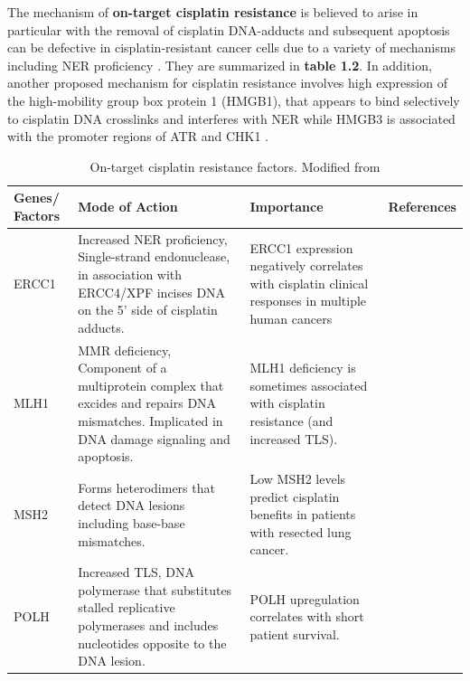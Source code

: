 The mechanism of \textbf{on-target cisplatin resistance} is believed to arise in particular with the removal of cisplatin DNA-adducts and subsequent apoptosis can be defective in cisplatin-resistant cancer cells due to a variety of mechanisms including \ac{NER} proficiency \cite{wood2000dna, shuck2008eukaryotic}. They are summarized in \textbf{table 1.2}. In addition, another proposed mechanism for cisplatin resistance involves high expression of the high-mobility group box protein 1 (HMGB1), that appears to bind selectively to cisplatin DNA crosslinks and interferes with \ac{NER} while HMGB3 is associated with the promoter regions of ATR and CHK1 \cite{awuah2017repair, mukherjee2019targeting}. 



\begin{table}[htbp]
   \centering
   \caption{On-target cisplatin resistance factors. Modified from \cite{galluzzi2012molecular}}
    \begin{tabular}{p{1.5cm}p{5cm}p{5cm}p{1cm}}
     \hline
      \textbf{Genes/ Factors} & \multicolumn{1}{l}{ \textbf{Mode of Action}} & \multicolumn{1}{p{5cm}}{ \textbf{Importance}} & \multicolumn{1}{p{5cm}}{ \textbf{References}} \\ \hline
ERCC1  & Increased NER proficiency, Single-strand endonuclease, in association with ERCC4/XPF incises DNA on the 5' side of cisplatin adducts. & ERCC1 expression negatively correlates with  cisplatin clinical responses in multiple human cancers & \multicolumn{1}{p{5cm}}{\cite{dabholkar1992ercc1, metzger1998ercc1, bellmunt2007gene, shirota2001ercc1}} \\
MLH1 & MMR deficiency, Component of a multiprotein complex that excides and repairs DNA mismatches. Implicated in DNA damage signaling and apoptosis. & MLH1 deficiency is sometimes associated with  cisplatin resistance (and increased TLS).  & \multicolumn{1}{p{5cm}}{\cite{aebi1996loss, gifford2004acquisition}} \\
MSH2  & Forms heterodimers that detect DNA lesions including base-base mismatches. & Low MSH2 levels predict  cisplatin benefits in patients with resected lung cancer. & \multicolumn{1}{p{5cm}}{\cite{kamal2010muts}} \\
POLH & Increased TLS, DNA polymerase that substitutes stalled replicative polymerases and includes nucleotides opposite to the DNA lesion. & POLH upregulation correlates with short patient survival. & \multicolumn{1}{p{5cm}}{\cite{alt2007bypass, shachar2009two}} \\

\end{tabular}
\end{table}
